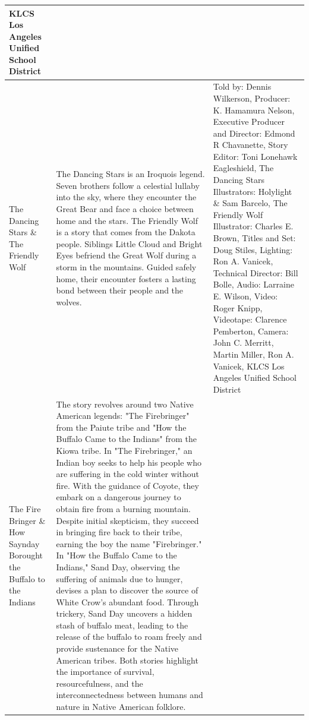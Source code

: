 \begin{table}[h]
\begin{small}
\begin{tabular}{|p{1.5cm}|p{8.5cm}|p{7cm}|}
            KLCS Los Angeles Unified School District
            \\
            \hline
            The Dancing Stars \& The Friendly Wolf
                                 &
            The Dancing Stars is an Iroquois legend.
            Seven brothers follow a celestial lullaby into the sky, where they encounter the Great Bear and face a choice between home and the stars.
            The Friendly Wolf is a story that comes from the Dakota people.
            Siblings Little Cloud and Bright Eyes befriend the Great Wolf during a storm in the mountains.
            Guided safely home, their encounter fosters a lasting bond between their people and the wolves.
                                 &
            Told by: Dennis Wilkerson,
            Producer: K. Hamamura Nelson,
            Executive Producer and Director: Edmond R Chavanette,
            Story Editor: Toni Lonehawk Eagleshield,
            The Dancing Stars Illustrators: Holylight \& Sam Barcelo,
            The Friendly Wolf Illustrator: Charles E. Brown,
            Titles and Set: Doug Stiles,
            Lighting: Ron A. Vanicek,
            Technical Director: Bill Bolle,
            Audio: Larraine E. Wilson,
            Video: Roger Knipp,
            Videotape: Clarence Pemberton,
            Camera: John C. Merritt, Martin Miller, Ron A. Vanicek,
            KLCS Los Angeles Unified School District
            \\
            \hline
            The Fire Bringer \& How Saynday Borought the Buffalo to the Indians
                                 &
            The story revolves around two Native American legends: "The Firebringer" from the Paiute tribe and "How the Buffalo Came to the Indians" from the Kiowa tribe.
            In "The Firebringer," an Indian boy seeks to help his people who are suffering in the cold winter without fire.
            With the guidance of Coyote, they embark on a dangerous journey to obtain fire from a burning mountain.
            Despite initial skepticism, they succeed in bringing fire back to their tribe, earning the boy the name "Firebringer."
            In "How the Buffalo Came to the Indians," Sand Day, observing the suffering of animals due to hunger, devises a plan to discover the source of White Crow's abundant food.
            Through trickery, Sand Day uncovers a hidden stash of buffalo meat, leading to the release of the buffalo to roam freely and provide sustenance for the Native American tribes.
            Both stories highlight the importance of survival, resourcefulness, and the interconnectedness between humans and nature in Native American folklore.

\end{tabular}
\end{small}
\end{table}
